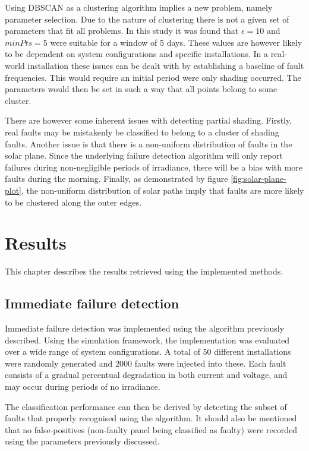 Using DBSCAN as a clustering algorithm implies a new problem, namely parameter selection.
Due to the nature of clustering there is not a given set of parameters that fit all problems.
In this study it was found that $\epsilon = 10$ and $minPts = 5$ were suitable for a window of 5 days.
These values are however likely to be dependent on system configurations and specific installations.
In a real-world installation these issues can be dealt with by establishing a baseline of fault frequencies.
This would require an initial period were only shading occurred.
The parameters would then be set in such a way that all points belong to some cluster.

There are however some inherent issues with detecting partial shading.
Firstly, real faults may be mistakenly be classified to belong to a cluster of shading faults.
Another issue is that there is a non-uniform distribution of faults in the solar plane.
Since the underlying failure detection algorithm will only report failures during non-negligible periods
of irradiance, there will be a bias with more faults during the morning.
Finally, as demonstrated by figure \ref{fig:solar-plane-plot}, the non-uniform distribution of solar paths imply that 
faults are more likely to be clustered along the outer edges.

\chapter{Results}
This chapter describes the results retrieved using the implemented methods.

\section{Immediate failure detection}
Immediate failure detection was implemented using the algorithm previously described.
Using the simulation framework, the implementation was evaluated over a wide range of system configurations.
A total of 50 different installations were randomly generated and 2000 faults were injected into these.
Each fault consists of a gradual percentual degradation in both current and voltage, and may occur during periods of no irradiance.

The classification performance can then be derived by detecting the subset of faults that properly recognised using the algorithm.
It should also be mentioned that no false-positives (non-faulty panel being classified as faulty) were recorded using the parameters previously discussed.

